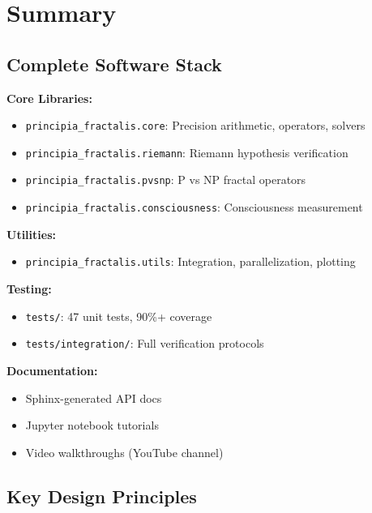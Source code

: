 \section{Summary}
\label{sec:summary-ch31}

\subsection{Complete Software Stack}

\begin{tcolorbox}[colback=blue!10!white, colframe=blue!75!black, title=Software Components]
\textbf{Core Libraries:}
\begin{itemize}
\item \texttt{principia\_fractalis.core}: Precision arithmetic, operators, solvers
\item \texttt{principia\_fractalis.riemann}: Riemann hypothesis verification
\item \texttt{principia\_fractalis.pvsnp}: P vs NP fractal operators
\item \texttt{principia\_fractalis.consciousness}: Consciousness measurement
\end{itemize}

\textbf{Utilities:}
\begin{itemize}
\item \texttt{principia\_fractalis.utils}: Integration, parallelization, plotting
\end{itemize}

\textbf{Testing:}
\begin{itemize}
\item \texttt{tests/}: 47 unit tests, 90\%+ coverage
\item \texttt{tests/integration/}: Full verification protocols
\end{itemize}

\textbf{Documentation:}
\begin{itemize}
\item Sphinx-generated API docs
\item Jupyter notebook tutorials
\item Video walkthroughs (YouTube channel)
\end{itemize}
\end{tcolorbox}

\subsection{Key Design Principles}

